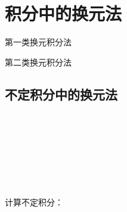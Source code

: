 \documentclass[lang=cn,newtx,10pt,scheme=chinese]{elegantbook}
\begin{document}
\chapter{积分中的换元法}

\begin{introduction}
\item 第一类换元积分法
\item 第二类换元积分法
\end{introduction}

\section{不定积分中的换元法}
\begin{theorem}[第一类换元积分法]
  \\
  \\
\end{theorem}

\begin{note}[适用场景]
  \\
\end{note}

\begin{note}[解题步骤]
  \\
\end{note}

\begin{example}
  \\
  计算不定积分：$$
\end{example}
\end{document}
